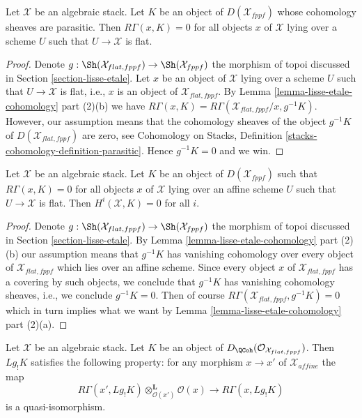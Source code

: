 \begin{lemma}
\label{lemma-cohomology-parasitic}
Let $\mathcal{X}$ be an algebraic stack. Let $K$ be an object of
$D(\mathcal{X}_{fppf})$ whose cohomology sheaves are parasitic. Then
$R\Gamma(x, K) = 0$ for all objects $x$ of $\mathcal{X}$ lying
over a scheme $U$ such that $U \to \mathcal{X}$ is flat.
\end{lemma}

\begin{proof}
Denote $g : \Sh(\mathcal{X}_{flat, fppf}) \to \Sh(\mathcal{X}_{fppf})$
the morphism of topoi discussed in Section \ref{section-lisse-etale}.
Let $x$ be an object of $\mathcal{X}$ lying over a scheme $U$
such that $U \to \mathcal{X}$ is flat, i.e., $x$ is an object
of $\mathcal{X}_{flat, fppf}$.
By Lemma \ref{lemma-lisse-etale-cohomology} part (2)(b) we have
$R\Gamma(x, K) = R\Gamma(\mathcal{X}_{flat, fppf}/x, g^{-1}K)$.
However, our assumption means that the cohomology sheaves
of the object $g^{-1}K$ of $D(\mathcal{X}_{flat, fppf})$ are zero, see
Cohomology on Stacks, Definition \ref{stacks-cohomology-definition-parasitic}.
Hence $g^{-1}K = 0$ and we win.
\end{proof}

\begin{lemma}
\label{lemma-cohomology-parasitic-complex}
Let $\mathcal{X}$ be an algebraic stack. Let $K$ be an object of
$D(\mathcal{X}_{fppf})$ such that $R\Gamma(x, K) = 0$ for all objects
$x$ of $\mathcal{X}$ lying over an affine scheme $U$ such that
$U \to \mathcal{X}$ is flat. Then $H^i(\mathcal{X}, K) = 0$ for all $i$.
\end{lemma}

\begin{proof}
Denote $g : \Sh(\mathcal{X}_{flat, fppf}) \to \Sh(\mathcal{X}_{fppf})$
the morphism of topoi discussed in Section \ref{section-lisse-etale}.
By Lemma \ref{lemma-lisse-etale-cohomology} part (2)(b) our assumption
means that $g^{-1}K$ has vanishing cohomology over every object
of $\mathcal{X}_{flat, fppf}$ which lies over an affine scheme.
Since every object $x$ of $\mathcal{X}_{flat, fppf}$ has a covering
by such objects, we conclude that $g^{-1}K$ has vanishing cohomology
sheaves, i.e., we conclude $g^{-1}K = 0$. Then of course
$R\Gamma(\mathcal{X}_{flat, fppf}, g^{-1}K) = 0$ which in turn implies
what we want by Lemma \ref{lemma-lisse-etale-cohomology} part (2)(a).
\end{proof}

\begin{lemma}
\label{lemma-higher-shriek-QC}
Let $\mathcal{X}$ be an algebraic stack. Let $K$ be an object of
$D_\QCoh(\mathcal{O}_{\mathcal{X}_{flat, fppf}})$. Then $Lg_!K$ satisfies
the following property: for any morphism $x \to x'$ of
$\mathcal{X}_{affine}$ the map
$$
R\Gamma(x', Lg_!K) \otimes_{\mathcal{O}(x')}^\mathbf{L} \mathcal{O}(x)
\longrightarrow
R\Gamma(x, Lg_!K)
$$
is a quasi-isomorphism.
\end{lemma}

